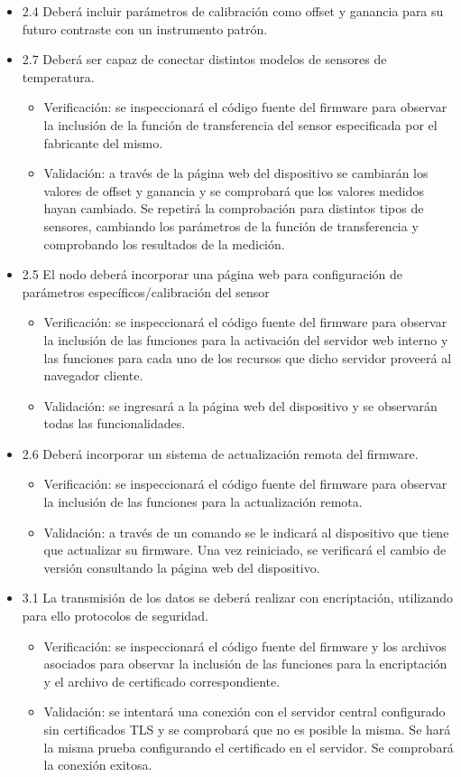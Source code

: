 \documentclass[11pt]{charter}
\begin{document}
\begin{itemize}
\item 2.4 Deberá incluir parámetros de calibración como offset y ganancia para su futuro contraste con un instrumento patrón.
\item 2.7 Deberá ser capaz de conectar distintos modelos de sensores de temperatura.
\begin{itemize}
\item Verificación: se inspeccionará el código fuente del firmware para observar la inclusión de la función de transferencia del sensor especificada por el fabricante del mismo.
\item Validación: a través de la página web del dispositivo se cambiarán los valores de offset y ganancia y se comprobará que los valores medidos hayan cambiado. Se repetirá la comprobación para distintos tipos de sensores, cambiando los parámetros de la función de transferencia y comprobando los resultados de la medición.
\end{itemize}

\item 2.5 El nodo deberá incorporar una página web para configuración de parámetros específicos/calibración del sensor
\begin{itemize}
\item Verificación: se inspeccionará el código fuente del firmware para observar la inclusión de las funciones para la activación del servidor web interno y las funciones para cada uno de los recursos que dicho servidor proveerá al navegador cliente.
\item Validación: se ingresará a la página web del dispositivo y se observarán todas las funcionalidades.
\end{itemize}


\item 2.6 Deberá incorporar un sistema de actualización remota del firmware.
\begin{itemize}
\item Verificación: se inspeccionará el código fuente del firmware para observar la inclusión de las funciones para la actualización remota.
\item Validación: a través de un comando se le indicará al dispositivo que tiene que actualizar su firmware. Una vez reiniciado, se verificará el cambio de versión consultando la página web del dispositivo.
\end{itemize}

\item 3.1 La transmisión de los datos se deberá realizar con encriptación, utilizando para ello protocolos de seguridad.
\begin{itemize}
\item Verificación: se inspeccionará el código fuente del firmware y los archivos asociados para observar la inclusión de las funciones para la encriptación y el archivo de certificado correspondiente.
\item Validación: se intentará una conexión con el servidor central configurado sin certificados TLS y se comprobará que no es posible la misma. Se hará la misma prueba configurando el certificado en el servidor. Se comprobará la conexión exitosa.
\end{itemize}


\end{itemize}
\end{document}

